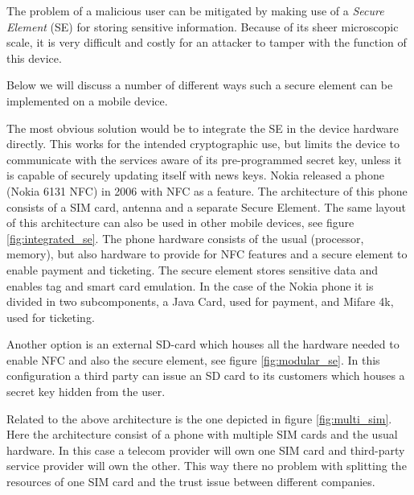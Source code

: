 The problem of a malicious user can be mitigated by making use of a \textit{Secure Element} (SE) for storing sensitive information.
Because of its sheer microscopic scale, it is very difficult and costly for an attacker to tamper with the function of this device.

Below we will discuss a number of different ways such a secure element can be implemented on a mobile device. 

The most obvious solution would be to integrate the SE in the device hardware directly.
This works for the intended cryptographic use, but limits the device to communicate with the services aware of its pre-programmed secret key, unless it is capable of securely updating itself with news keys.
Nokia released a phone (Nokia 6131 NFC) in 2006 with NFC as a feature.
The architecture of this phone consists of a SIM card, antenna and a separate Secure Element.
The same layout of this architecture can also be used in other mobile devices, see figure \ref{fig:integrated_se}.
The phone hardware consists of the usual (processor, memory), but also hardware to provide for NFC features and a secure element to enable payment and ticketing.
The secure element stores sensitive data and enables tag and smart card emulation.
In the case of the Nokia phone it is divided in two subcomponents, a Java Card, used for payment, and Mifare 4k, used for ticketing.


Another option is an external SD-card which houses all the hardware needed to enable NFC and also the secure element, see figure \ref{fig:modular_se}.
In this configuration a third party can issue an SD card to its customers which houses a secret key hidden from the user.

Related to the above architecture is the one depicted in figure \ref{fig:multi_sim}.
Here the architecture consist of a phone with multiple SIM cards and the usual hardware.
In this case a telecom provider will own one SIM card and third-party service provider will own the other.
This way there no problem with splitting the resources of one SIM card and the trust issue between different companies.

